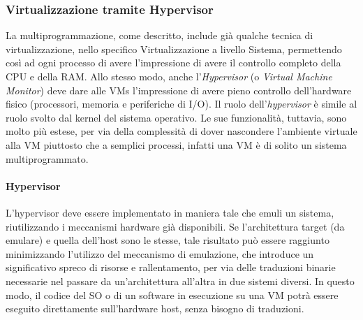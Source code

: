 \documentclass{article}
\begin{document}
\subsubsection{Virtualizzazione tramite Hypervisor}
La multiprogrammazione, come descritto, include già qualche tecnica di virtualizzazione, nello specifico Virtualizzazione a livello Sistema, permettendo così ad ogni processo di avere l’impressione di avere il controllo completo della CPU e della RAM.
Allo stesso modo, anche l’\textit{Hypervisor} (o \textit{Virtual Machine Monitor}) deve dare alle VMs l’impressione di avere pieno controllo dell’hardware fisico (processori, memoria e periferiche di I/O).
Il ruolo dell’\textit{hypervisor} è simile al ruolo svolto dal kernel del sistema operativo. Le sue funzionalità, tuttavia, sono molto più estese, per via della complessità di dover nascondere l'ambiente virtuale alla VM piuttosto che a semplici processi, infatti una VM è di solito un sistema multiprogrammato.

\paragraph{Hypervisor}
L’hypervisor deve essere implementato in maniera tale che emuli un sistema, riutilizzando i meccanismi hardware già disponibili.
Se l’architettura target (da emulare) e quella dell’host sono le stesse, tale risultato può essere raggiunto minimizzando l’utilizzo del meccanismo di emulazione, che introduce un significativo spreco di risorse e rallentamento, per via delle traduzioni binarie necessarie nel passare da un’architettura all’altra in due sistemi diversi.
In questo modo, il codice del SO o di un software in esecuzione su una VM potrà essere eseguito direttamente sull’hardware host, senza bisogno di traduzioni.
\end{document}
